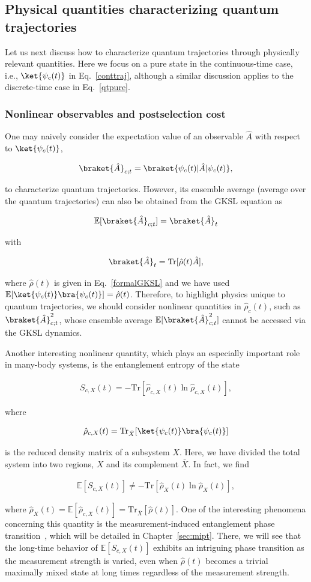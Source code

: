 \documentclass[preprint,pteplogo]{ptephy_v2}%
\numberwithin{equation}{section}
\theoremstyle{definition}
\newcommand{\mr}[1]{\mathrm{#1}}
\newcommand{\mbb}[1]{\mathbb{#1}}
\newcommand{\aln}[1]{
\begin{align}
#1
\end{align}
}
\newcommand{\Tr}{\mr{Tr}}
\begin{document}
\subsection{Physical quantities characterizing quantum trajectories}
Let us next discuss how to characterize quantum trajectories through physically relevant quantities.
Here we focus on a pure state in the continuous-time case, i.e., $\ket{\psi_c(t)}$ in Eq.~\eqref{conttraj}, although a similar discussion applies to the discrete-time case in Eq.~\eqref{qtpure}.


\subsubsection{Nonlinear observables and postselection cost}
\label{sec:nonlinear-observables}
One may naively consider the expectation value of an observable $\hat{A}$ with respect to $\ket{\psi_c(t)}$, 
\aln{
\braket{\hat{A}}_{c;t}=\braket{\psi_c(t)|\hat{A}|\psi_c(t)},
}
to characterize quantum trajectories.
However, its ensemble average (average over the quantum trajectories) can also be obtained from the GKSL equation as 
\aln{\label{eq:expectation-value}
\mbb{E}[\braket{\hat{A}}_{c;t}]=\braket{\hat{A}}_t
}
with
\aln{\label{eq:expectation-value2}
\braket{\hat{A}}_t=\mr{Tr}[{\hat{\rho}(t)\hat{A}}],
}
where $\hat{\rho}(t)$ is given in Eq.~\eqref{formalGKSL} and we have used $\mathbb{E}[\ket{\psi_c(t)}\bra{\psi_c(t)}]=\hat{\rho}(t)$.
Therefore, to highlight physics unique to quantum trajectories, we should consider nonlinear quantities in $\hat{\rho}_c(t)$, such as $\braket{\hat{A}}_{c;t}^2$, whose ensemble average $\mbb{E}[\braket{\hat{A}}_{c;t}^2]$ cannot be accessed via the GKSL dynamics.

Another interesting nonlinear quantity, which plays an especially important role in many-body systems, is the entanglement entropy of the state 
\aln{
S_{c,X}(t)=-\mr{Tr}[\hat{\rho}_{c,X}(t)\ln \hat{\rho}_{c,X}(t)],
}
where 
\aln{
\hat{\rho}_{c,X}(t) =\mr{Tr}_{\bar{X}}[\ket{\psi_c(t)}\bra{\psi_c(t)}]
}
is the reduced density matrix of a subsystem $X$. 
Here, we have divided the total system into two regions, $X$ and its complement $\bar{X}$.
In fact, we find
\aln{
\mbb{E}[S_{c,X}(t)]\neq -\Tr[\hat{\rho}_X(t)\ln \hat{\rho}_X(t)],
}
where $\hat{\rho}_X(t)=\mbb{E}[\hat{\rho}_{c,X}(t)]=\mr{Tr}_{\bar{X}}[\hat{\rho}(t)]$.
One of the interesting phenomena concerning this quantity is the measurement-induced entanglement phase transition~\cite{skinner2019measurement, li2018quantum, chan2019unitary}, which will be detailed in Chapter~\ref{sec:mipt}.
There, we will see that the long-time behavior of $\mbb{E}[S_{c,X}(t)]$ exhibits an intriguing phase transition as the measurement strength is varied, even when $\hat{\rho}(t)$ becomes a trivial maximally mixed state at long times regardless of the measurement strength.
\end{document}

